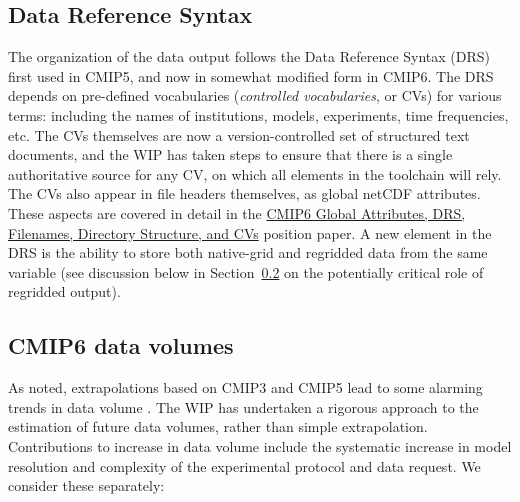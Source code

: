 \documentclass[gmd,manuscript]{copernicus}
\newcommand{\secref}[1] {\mbox{Section  \ref{sec:#1}}}
\begin{document}
\subsection{Data Reference Syntax}
\label{sec:data-drs}

The organization of the data output follows the Data Reference Syntax
(DRS) first used in CMIP5, and now in somewhat modified form in CMIP6.
The DRS depends on pre-defined vocabularies (\emph{controlled
  vocabularies}, or CVs) for various terms: including the names of
institutions, models, experiments, time frequencies, etc. The CVs
themselves are now a version-controlled set of structured text
documents, and the WIP has taken steps to ensure that there is a
single authoritative source for any CV, on which all elements in the
toolchain will rely. The CVs also appear in file headers themselves,
as global netCDF attributes. These aspects are covered in detail in
the \href{https://goo.gl/cMiPE7}{CMIP6 Global Attributes, DRS,
  Filenames, Directory Structure, and CVs} position paper. A new
element in the DRS is the ability to store both native-grid and
regridded data from the same variable (see discussion below in
\secref{dvol} on the potentially critical role of regridded output).


\subsection{CMIP6 data volumes}
\label{sec:dvol}

As noted, extrapolations based on CMIP3 and CMIP5 lead to some
alarming trends in data volume \citep[see
e.g.,][]{ref:overpecketal2011}. The WIP has undertaken a rigorous
approach to the estimation of future data volumes, rather than simple
extrapolation. Contributions to increase in data volume include the
systematic increase in model resolution and complexity of the
experimental protocol and data request. We consider these separately:
\end{document}
